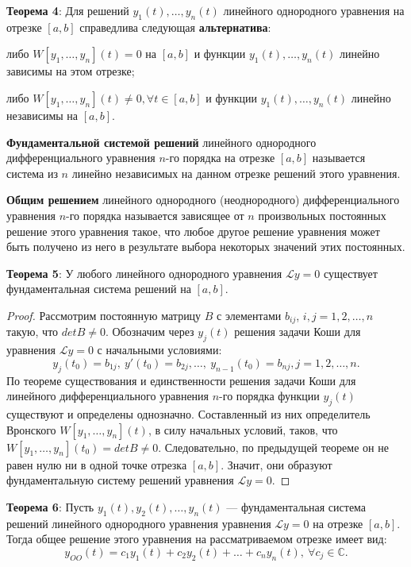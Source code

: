\textbf{Теорема 4}: Для решений $y_1(t),\dots, y_n(t)$ линейного однородного уравнения на отрезке $[a, b]$ справедлива следующая \textbf{альтернатива}: 

либо $W[y_1,\dots, y_n](t) = 0$ на $[a, b]$ и функции $y_1(t),\dots ,y_n(t)$ линейно зависимы на этом отрезке;

либо $W[y_1,\dots ,y_n](t)\neq 0, \forall t \in [a, b]$ и функции $y_1(t),\dots , y_n(t)$ линейно независимы на $[a, b]$.

\textbf{Фундаментальной системой решений} линейного однородного дифференциального уравнения $n$-го порядка на отрезке $[a, b]$ называется система из $n$ линейно независимых на данном отрезке решений этого уравнения.

\textbf{Общим решением} линейного однородного (неоднородного) дифференциального уравнения $n$-го порядка называется зависящее от $n$ произвольных постоянных решение этого уравнения такое, что любое другое решение уравнения может быть получено из него в результате выбора некоторых значений этих постоянных.

\textbf{Теорема 5}: У любого линейного однородного уравнения $\mathcal{L}y = 0$ существует фундаментальная система решений на $[a, b]$.

\begin{proof}
Рассмотрим постоянную матрицу $B$ с элементами $b_{ij}$, $i,j = 1, 2,\dots , n$ такую, что $det B\neq  0$. Обозначим через $y_j(t)$ решения задачи Коши для уравнения $\mathcal{L} y = 0$ с начальными условиями:
$$y_j(t_0) = b_{1j},~y'(t_0) = b_{2j},\dots ,~y_{n-1}(t_0) = b_{nj}, j = 1,2,\dots ,n.$$
По теореме существования и единственности решения задачи Коши для линейного дифференциального уравнения $n$-го порядка функции $y_j(t)$ существуют и определены однозначно. Составленный из них определитель Вронского $W[y_1,\dots , y_n](t)$, в силу начальных условий, таков, что
$W[y_1,\dots ,y_n](t_0) = detB\neq 0$. Следовательно, по предыдущей теореме он не равен нулю ни в одной точке отрезка $[a, b]$. Значит, они образуют фундаментальную систему решений уравнения $\mathcal{L}y = 0$.
\end{proof}

\textbf{Теорема 6}: Пусть $y_1(t), y_2(t),\dots, y_n(t)$ --- фундаментальная система решений линейного однородного уравнения уравнения $\mathcal{L}y = 0$ на отрезке $[a, b]$. Тогда общее решение этого уравнения на рассматриваемом отрезке имеет вид:
\begin{equation}
    y_{OO}(t) = c_1y_1(t) + c_2y_2(t) +\dots + c_ny_n(t),~\forall c_j \in \mathbb{C}.
    \label{t2}
\end{equation}

